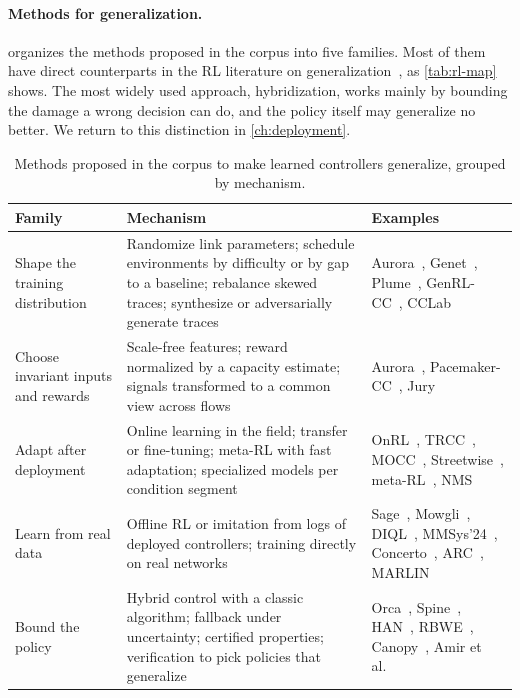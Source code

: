 \paragraph{Methods for generalization.}  organizes the methods proposed in the corpus into five families. Most of them have direct counterparts in the RL literature on generalization~\cite{kirk2023survey}, as \cref{tab:rl-map} shows. The most widely used approach, hybridization, works mainly by bounding the damage a wrong decision can do, and the policy itself may generalize no better. We return to this distinction in \cref{ch:deployment}.

\begin{table}[t]
\centering
\caption{Methods proposed in the corpus to make learned controllers generalize, grouped by mechanism.}
\label{tab:gen-methods}
\small
\begin{tabularx}{\linewidth}{@{}L{3.3cm}YL{4.1cm}@{}}
\toprule
Family & Mechanism & Examples \\
\midrule
Shape the training distribution & Randomize link parameters; schedule environments by difficulty or by gap to a baseline; rebalance skewed traces; synthesize or adversarially generate traces & Aurora~\cite{jay2019aurora}, Genet~\cite{xia2022genet}, Plume~\cite{patel2023plume}, GenRL-CC~\cite{islam2026genrl}, CCLab~\cite{chen2026cclab} \\
Choose invariant inputs and rewards & Scale-free features; reward normalized by a capacity estimate; signals transformed to a common view across flows & Aurora~\cite{jay2019aurora}, Pacemaker-CC~\cite{chae2026pacemaker}, Jury~\cite{tian2025jury} \\
Adapt after deployment & Online learning in the field; transfer or fine-tuning; meta-RL with fast adaptation; specialized models per condition segment & OnRL~\cite{zhang2020onrl}, TRCC~\cite{zheng2023trcc}, MOCC~\cite{ma2022mocc}, Streetwise~\cite{soni2024streetwise}, meta-RL~\cite{mwaura2025adaptive,bai2025metacon,chen2025generalizable}, NMS~\cite{yao2025unified} \\
Learn from real data & Offline RL or imitation from logs of deployed controllers; training directly on real networks & Sage~\cite{yen2023sage}, Mowgli~\cite{agarwal2025mowgli}, DIQL~\cite{khairy2026human}, MMSys'24~\cite{khairy2024acm}, Concerto~\cite{zhou2019concerto}, ARC~\cite{zhang2020reinforcement}, MARLIN~\cite{galliera2023marlin} \\
Bound the policy & Hybrid control with a classic algorithm; fallback under uncertainty; certified properties; verification to pick policies that generalize & Orca~\cite{abbasloo2020orca}, Spine~\cite{tian2024spine}, HAN~\cite{jia2026han}, RBWE~\cite{kai2025robust}, Canopy~\cite{yang2024canopy}, Amir et al.~\cite{amir2024verifying} \\
\bottomrule
\end{tabularx}
\end{table}

